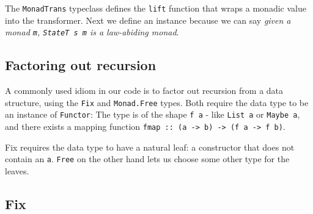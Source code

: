 \documentclass[runningheads,plain]{llncs}
\newenvironment{Shaded}{}{}
\newcommand{\KeywordTok}[1]{\textcolor[rgb]{0.00,0.44,0.13}{\textbf{#1}}}
\newcommand{\DataTypeTok}[1]{\textcolor[rgb]{0.56,0.13,0.00}{#1}}
\newcommand{\OtherTok}[1]{\textcolor[rgb]{0.00,0.44,0.13}{#1}}
\newcommand{\FunctionTok}[1]{\textcolor[rgb]{0.02,0.16,0.49}{#1}}
\newcommand{\NormalTok}[1]{#1}
\begin{document}
\begin{Shaded}
\end{Shaded}

The \texttt{MonadTrans} typeclass defines the \texttt{lift} function
that wraps a monadic value into the transformer. Next we define an
instance because we can say \emph{given a monad \texttt{m},
\texttt{StateT\ s\ m} is a law-abiding monad}.

\subsection{Factoring out recursion}\label{factoring-recursion}

A commonly used idiom in our code is to factor out recursion from a data
structure, using the \texttt{Fix} and \texttt{Monad.Free} types. Both
require the data type to be an instance of \texttt{Functor}: The type is
of the shape \texttt{f\ a} - like \texttt{List\ a} or \texttt{Maybe\ a},
and there exists a mapping function
\texttt{fmap\ ::\ (a\ -\textgreater{}\ b)\ -\textgreater{}\ (f\ a\ -\textgreater{}\ f\ b)}.

Fix requires the data type to have a natural leaf: a constructor that
does not contain an \texttt{a}. \texttt{Free} on the other hand lets us
choose some other type for the leaves.

\subsection{Fix}\label{fix}
\end{document}
